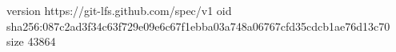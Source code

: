 version https://git-lfs.github.com/spec/v1
oid sha256:087c2ad3f34c63f729e09e6c67f1ebba03a748a06767cfd35cdcb1ae76d13c70
size 43864
